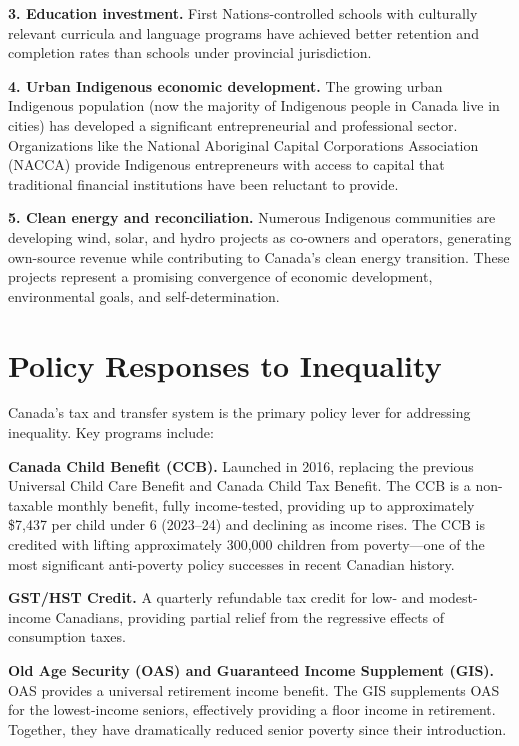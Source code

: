 \textbf{3. Education investment.} First Nations-controlled schools with culturally relevant curricula and language programs have achieved better retention and completion rates than schools under provincial jurisdiction.

\textbf{4. Urban Indigenous economic development.} The growing urban Indigenous population (now the majority of Indigenous people in Canada live in cities) has developed a significant entrepreneurial and professional sector. Organizations like the National Aboriginal Capital Corporations Association (NACCA) provide Indigenous entrepreneurs with access to capital that traditional financial institutions have been reluctant to provide.

\textbf{5. Clean energy and reconciliation.} Numerous Indigenous communities are developing wind, solar, and hydro projects as co-owners and operators, generating own-source revenue while contributing to Canada's clean energy transition. These projects represent a promising convergence of economic development, environmental goals, and self-determination.

\section{Policy Responses to Inequality}

Canada's tax and transfer system is the primary policy lever for addressing inequality. Key programs include:

\textbf{Canada Child Benefit (CCB).} Launched in 2016, replacing the previous Universal Child Care Benefit and Canada Child Tax Benefit. The CCB is a non-taxable monthly benefit, fully income-tested, providing up to approximately \$7,437 per child under 6 (2023--24) and declining as income rises. The CCB is credited with lifting approximately 300,000 children from poverty---one of the most significant anti-poverty policy successes in recent Canadian history.

\textbf{GST/HST Credit.} A quarterly refundable tax credit for low- and modest-income Canadians, providing partial relief from the regressive effects of consumption taxes.

\textbf{Old Age Security (OAS) and Guaranteed Income Supplement (GIS).} OAS provides a universal retirement income benefit. The GIS supplements OAS for the lowest-income seniors, effectively providing a floor income in retirement. Together, they have dramatically reduced senior poverty since their introduction.


